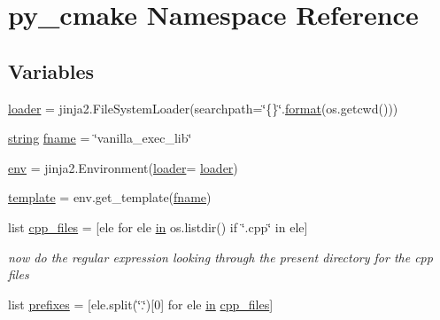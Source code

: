 \hypertarget{namespacepy__cmake}{}\section{py\+\_\+cmake Namespace Reference}
\label{namespacepy__cmake}
\subsection*{Variables}
\begin{DoxyCompactItemize}
\item 
\mbox{\hyperlink{namespacepy__cmake_a84a25d33eb535db93c795c9b431ad3e4}{loader}} = jinja2.\+File\+System\+Loader(searchpath=\char`\"{}\{\}\char`\"{}.\mbox{\hyperlink{glad_8h_ae2d3db041c6004a67047659b42f73a44}{format}}(os.\+getcwd()))
\item 
\mbox{\hyperlink{glad_8h_ae84541b4f3d8e1ea24ec0f466a8c568b}{string}} \mbox{\hyperlink{namespacepy__cmake_a384351d048ae243fa2f2f419db26f3ad}{fname}} = \char`\"{}vanilla\+\_\+exec\+\_\+lib\char`\"{}
\item 
\mbox{\hyperlink{namespacepy__cmake_a80080b0f64acfa3a823fad76e05499bf}{env}} = jinja2.\+Environment(\mbox{\hyperlink{namespacepy__cmake_a84a25d33eb535db93c795c9b431ad3e4}{loader}}= \mbox{\hyperlink{namespacepy__cmake_a84a25d33eb535db93c795c9b431ad3e4}{loader}})
\item 
\mbox{\hyperlink{namespacepy__cmake_a5931934f67619e9c0e91f7eb4180f5f0}{template}} = env.\+get\+\_\+template(\mbox{\hyperlink{namespacepy__cmake_a384351d048ae243fa2f2f419db26f3ad}{fname}})
\item 
list \mbox{\hyperlink{namespacepy__cmake_a2adfb240dd9e470e11d95645a68c30e9}{cpp\+\_\+files}} = \mbox{[}ele for ele \mbox{\hyperlink{glad_8h_a83ad0ee7f1e06b59c90271716e689080}{in}} os.\+listdir() if \char`\"{}.cpp\char`\"{} in ele\mbox{]}
\begin{DoxyCompactList}\small\item\em now do the regular expression looking through the present directory for the cpp files \end{DoxyCompactList}\item 
list \mbox{\hyperlink{namespacepy__cmake_a59f5470f82dcb720da6c7a7c2d366a4f}{prefixes}} = \mbox{[}ele.\+split(\char`\"{}.\char`\"{})\mbox{[}0\mbox{]} for ele \mbox{\hyperlink{glad_8h_a83ad0ee7f1e06b59c90271716e689080}{in}} \mbox{\hyperlink{namespacepy__cmake_a2adfb240dd9e470e11d95645a68c30e9}{cpp\+\_\+files}}\mbox{]}
\end{DoxyCompactItemize}


